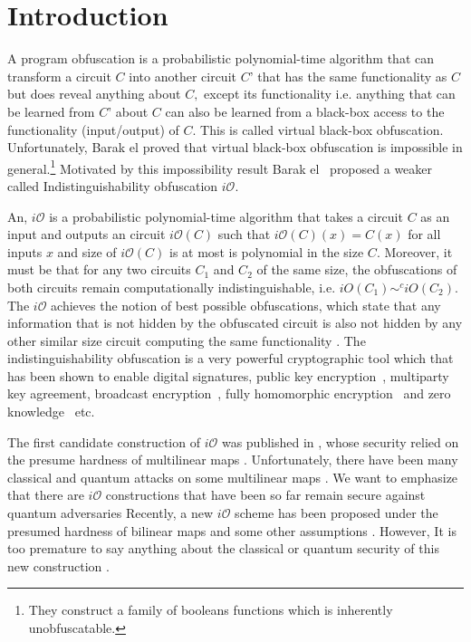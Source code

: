 \section{Introduction}
A program obfuscation is a probabilistic polynomial-time algorithm that can transform a circuit $C$ into another circuit $C’$ that has the same functionality as $C$ but does reveal anything about $C,$ except its functionality i.e. anything that can be learned from $C’$ about $C$ can also be learned from a black-box access to the functionality (input/output) of $C.$ This is called virtual black-box obfuscation. Unfortunately, Barak el  proved that virtual black-box obfuscation is impossible in general.\footnote{They construct a family of booleans functions which is inherently unobfuscatable.} Motivated by this impossibility result Barak el~\cite{BGI+12} proposed a weaker called Indistinguishability obfuscation $i\mathcal{O}.$ 

An, $i\mathcal{O}$ is a probabilistic polynomial-time algorithm that takes a circuit $C$ as an input and outputs an circuit $i\mathcal{O}(C)$ such that $i\mathcal{O}(C)(x)=C(x)$ for all inputs $x$ and size of  $i\mathcal{O}(C)$ is at most is polynomial in the size $C.$ Moreover, it must be that for any two circuits $C_1$ and $C_2$ of the same size, the obfuscations of both circuits remain computationally indistinguishable, i.e. $iO(C_1)\sim^c iO(C_2).$ The $i\mathcal{O}$ achieves the notion of best possible obfuscations, which state that any information that is not hidden by the obfuscated circuit is also not hidden by any other similar size circuit computing the same functionality \cite{GR2014}. The indistinguishability obfuscation is a very powerful cryptographic tool which that has been shown to enable digital signatures, public key encryption~\cite{SW14}, multiparty key agreement, broadcast encryption~\cite{BZ14}, fully homomorphic encryption~\cite{CLTV15} and zero knowledge~\cite{BP15} etc. 

The first candidate construction of $i\mathcal{O}$ was published in \cite{GGH+13}, whose security relied on the presume hardness of multilinear maps \cite{}. Unfortunately, there have been many classical and quantum attacks on some multilinear maps \cite{}. We want to emphasize that there are  $i\mathcal{O}$ constructions that have been so far remain secure against quantum adversaries \cite{} Recently, a new $i\mathcal{O}$ scheme has been proposed under the 
presumed hardness of bilinear maps and some other assumptions \cite{ALMS19}. However, It is too premature to say anything about the classical or quantum security of this new construction \cite{ALMS19}. 



